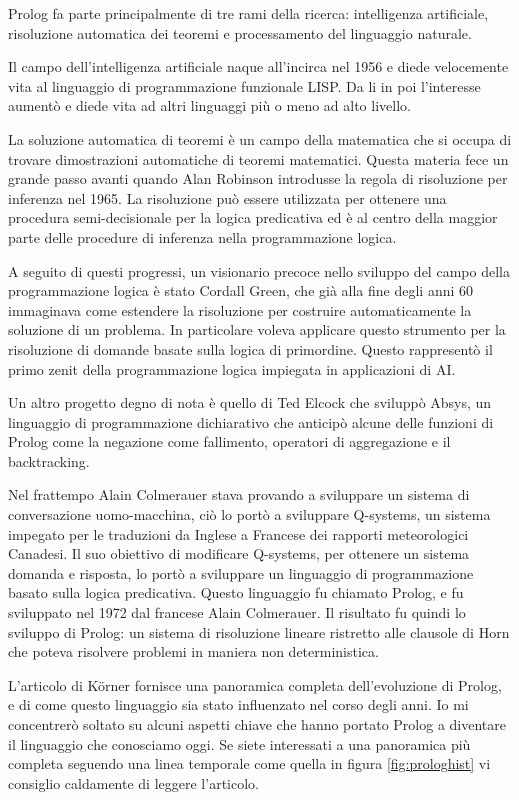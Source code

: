 Prolog fa parte principalmente di tre rami della ricerca: intelligenza artificiale, risoluzione automatica dei teoremi e processamento del linguaggio naturale.

Il campo dell'intelligenza artificiale naque all'incirca nel 1956 e diede velocemente vita al linguaggio di programmazione funzionale LISP. Da li in poi 
l'interesse aumentò e diede vita ad altri linguaggi più o meno ad alto livello.

La soluzione automatica di teoremi è un campo della matematica che si occupa di trovare dimostrazioni automatiche di teoremi matematici. Questa materia fece un grande passo avanti quando Alan Robinson introdusse la regola di risoluzione per inferenza nel 1965. La risoluzione può essere utilizzata per ottenere una procedura semi-decisionale per la logica predicativa ed è al centro della maggior parte delle procedure di inferenza nella programmazione logica.

A seguito di questi progressi, un visionario precoce nello sviluppo del campo della programmazione logica è stato Cordall Green, che già alla fine degli anni 60 immaginava come estendere la risoluzione per costruire 
automaticamente la soluzione di un problema. In particolare voleva applicare questo strumento per la risoluzione di domande basate sulla logica di primordine. Questo rappresentò il primo zenit della programmazione logica impiegata in applicazioni di AI.

Un altro progetto degno di nota è quello di Ted Elcock che sviluppò Absys, un linguaggio di programmazione dichiarativo che anticipò alcune delle funzioni di Prolog come la negazione come fallimento, operatori di aggregazione e il backtracking.

Nel frattempo Alain Colmerauer stava provando a sviluppare un sistema di conversazione uomo-macchina, ciò lo portò a sviluppare Q-systems, un sistema impegato per le traduzioni da Inglese a Francese dei rapporti meteorologici Canadesi. 
Il suo obiettivo di modificare Q-systems, per ottenere un sistema domanda e risposta, lo portò a sviluppare un linguaggio di programmazione basato sulla logica predicativa. Questo linguaggio fu chiamato Prolog, e fu sviluppato nel 1972 dal francese Alain Colmerauer.
Il risultato fu quindi lo sviluppo di Prolog: un sistema di risoluzione lineare ristretto alle clausole di Horn che poteva risolvere problemi in maniera non deterministica.

L'articolo di K{\"o}rner \cite{korner2022fifty} fornisce una panoramica completa dell'evoluzione di Prolog, e di come questo linguaggio sia stato influenzato nel corso degli anni. Io mi concentrerò soltato su alcuni aspetti chiave che hanno portato Prolog a diventare il linguaggio che conosciamo oggi.
Se siete interessati a una panoramica più completa seguendo una linea temporale come quella in figura \ref{fig:prologhist} vi consiglio caldamente di leggere l'articolo.
